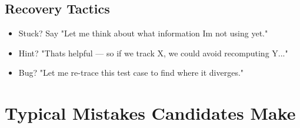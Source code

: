 \documentclass[11pt]{article}
\providecommand{\tightlist}{\setlength{\itemsep}{1pt}\setlength{\parskip}{0pt}}
\begin{document}
\subsection{Recovery Tactics}\label{recovery-tactics}

\begin{itemize}
\tightlist
\item
  Stuck? Say "Let me think about what information I\textquotesingle m not using yet."
\item
  Hint? "That\textquotesingle s helpful --- so if we track X, we could avoid recomputing Y..."
\item
  Bug? "Let me re-trace this test case to find where it diverges."
\end{itemize}

\section{Typical Mistakes Candidates Make}\label{typical-mistakes-candidates-make}
\end{document}

